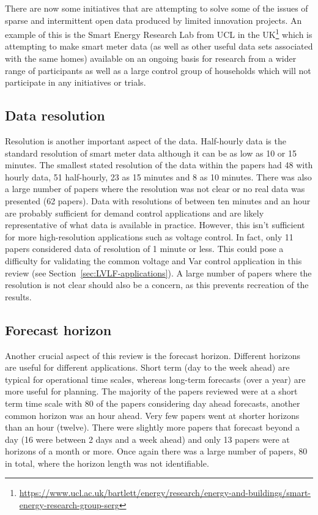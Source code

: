 There are now some initiatives that are attempting to solve some of the issues of sparse and intermittent open data produced by limited innovation projects. An example of this is the Smart Energy Research Lab from UCL in the  UK\footnote{\url{https://www.ucl.ac.uk/bartlett/energy/research/energy-and-buildings/smart-energy-research-group-serg}} which is attempting to make smart meter data (as well as other useful data sets associated with the same homes) available on an ongoing basis for research from a wider range of participants as well as a large control group of households which will not participate in any initiatives or trials. 

\subsection{Data resolution}
Resolution is another important aspect of the data. Half-hourly data is the standard resolution of smart meter data although it can be as low as 10 or 15 minutes. The smallest stated resolution of the data within the papers had 48 with hourly data, 51 half-hourly, 23 as 15 minutes and 8 as 10 minutes. There was also a large number of papers where the resolution was not clear or no real data was presented (62 papers). Data with resolutions of between ten minutes and an hour are probably sufficient for demand control applications and are likely representative of what data is available in practice. However, this isn't sufficient for more high-resolution applications such as voltage control. In fact, only 11 papers considered data of resolution of 1 minute or less. This could pose a difficulty for validating the common voltage and Var control application in this review (see Section~\ref{sec:LVLF-applications}). A large number of papers where the resolution is not clear should also be a concern, as this prevents recreation of the results. 

\subsection{Forecast horizon}
Another crucial aspect of this review is the forecast horizon. Different horizons are useful for different applications. Short term (day to the week ahead) are typical for operational time scales, whereas long-term forecasts (over a year) are more useful for planning. The majority of the papers reviewed were at a short term time scale with 80 of the papers considering day ahead forecasts, another common horizon was an hour ahead. Very few papers went at shorter horizons than an hour (twelve). There were slightly more papers that forecast beyond a day (16 were between 2 days and a week ahead) and only 13 papers were at horizons of a month or more. Once again there was a large number of papers, 80 in total, where the horizon length was not identifiable. 


